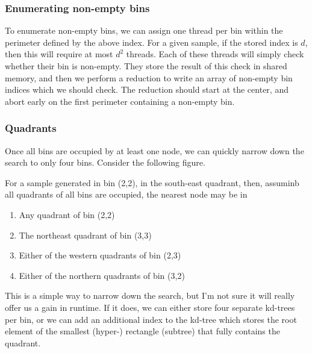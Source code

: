 \subsubsection{Enumerating non-empty bins}

To enumerate non-empty bins, we can assign one thread per bin within the perimeter defined by the above index. For a given sample, if the stored index is $d$, then this will require at most $d^2$ threads. Each of these threads will simply check whether their bin is non-empty. They store the result of this check in shared memory, and then we perform a reduction to write an array of non-empty bin indices which we should check. The reduction should start at the center, and abort early on the first perimeter containing
 a non-empty bin.


\subsubsection{Quadrants}

Once all bins are occupied by at least one node, we can quickly narrow down the search to only four bins. Consider the following figure.

\begin{figure}[h]
\begin{centering}
    \texttt{[image: \\figfile\{fig/nonempty\_full\_quad]}}
    \caption{Quandrants}
\end{centering} 
\end{figure}

For a sample generated in bin (2,2), in the south-east quadrant, then, assuminb all quadrants of all bins are occupied, the nearest node may be in 

\begin{enumerate}
    \item Any quadrant of bin (2,2)
    \item The northeast quadrant of bin (3,3)
    \item Either of the western quadrants of bin (2,3)
    \item Either of the northern quadrants of bin (3,2)
\end{enumerate}

This is a simple way to narrow down the search, but I'm not sure it will really offer us a gain in runtime. If it does, we can either store four separate kd-trees per bin, or we can add an additional index to the kd-tree which stores the root element of the smallest (hyper-) rectangle (subtree) that fully contains the quadrant.

